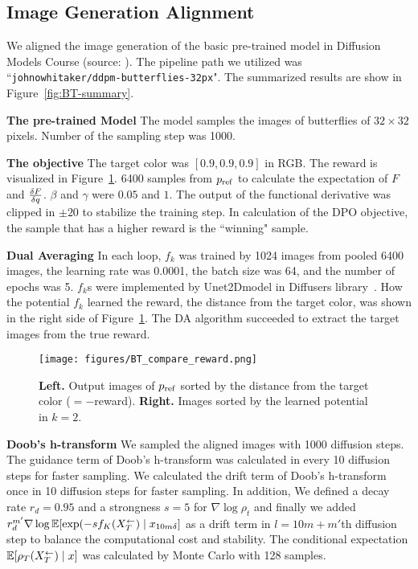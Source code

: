 \subsection{Image Generation Alignment}\label{sec:Appendix-Experimennt}

We aligned the image generation of the basic pre-trained model in Diffusion Models Course (source: \cite{huggingfacecourse}). The pipeline path we utilized was ``\texttt{johnowhitaker/ddpm-butterflies-32px}". The summarized results are show in Figure~\ref{fig:BT-summary}.

\textbf{The pre-trained Model}
The model samples the images of butterflies of $32 \times 32$ pixels. Number of the sampling step was 1000.

\textbf{The objective}
The target color was $[0.9,0.9,0.9]$ in RGB. The reward is visualized in Figure~\ref{fig:BT-compare}.
6400 samples from $p_{\rm{ref}}$ to calculate the expectation of $F$ and $\frac{\delta F}{\delta q}$. $\beta$ and $\gamma$ were $0.05$ and $1$. The output of the functional derivative was clipped in $\pm20$ to stabilize the training step. In calculation of the DPO objective, the sample that has a higher reward is the ``winning" sample.

\textbf{Dual Averaging}
 In each loop, $f_k$ was trained by 1024 images from pooled 6400 images, the learning rate was 0.0001, the batch size was 64, and the number of epochs was 5. $f_k$s were implemented by Unet2Dmodel in Diffusers library~\cite{huggingface2022Diffusers}. How the potential $f_k$ learned the reward, the distance from the target color, was shown in the right side of Figure~\ref{fig:BT-compare}. The DA algorithm succeeded to extract the target images from the true reward.

 \begin{figure}[htbp]
    \centering
    \texttt{[image: figures/BT\_compare\_reward.png]}
    \caption{\textbf{Left.} Output images of $p_{\rm{ref}}$ sorted by the distance from the target color ($=-$reward). \textbf{Right.} Images sorted by the learned potential in $k=2$.}
    \label{fig:BT-compare}
\end{figure}

\textbf{Doob's h-transform}
We sampled the aligned images with 1000 diffusion steps. The guidance term of Doob's h-transform was calculated in every 10 diffusion steps for faster sampling.
We calculated the drift term of Doob's h-transform once in 10 diffusion steps for faster sampling. In addition, We defined a decay rate $r_d = 0.95$ and a strongness $s=5$ for $\nabla \log \rho_{t}$ and finally we added $r_d^{m'} \nabla \log \mathbb{E} [\exp(- s f_K(X^\leftarrow_T)\mid x_{10m\delta }]$ as a drift term in $l = 10m + m'$th diffusion step to balance the computational cost and stability. The conditional expectation $\mathbb{E}[\rho_T(X^\leftarrow_T) \mid x]$ was calculated by Monte Carlo with 128 samples.


